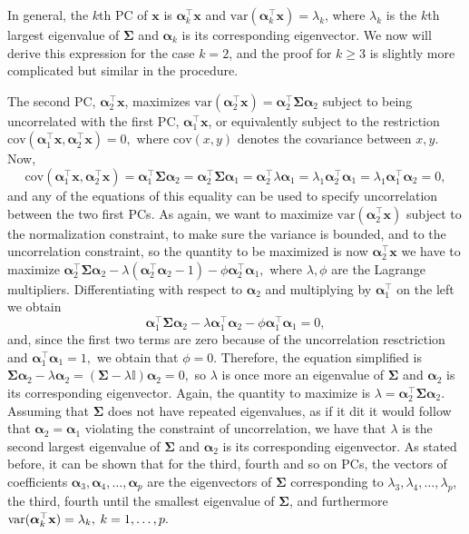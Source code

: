 \documentclass[11pt, oneside]{book}
\theoremstyle{plain}
\theoremstyle{remark}
\begin{document}
In general, the $k$th PC of $\mathbf{x}$ is $\bm{\alpha}_k^\top\mathbf{x}$ and
$\text{var}(\bm{\alpha}_k^\top\mathbf{x}) = \lambda_k$, where $\lambda_k$ is the
$k$th largest eigenvalue of $\mathbf{\Sigma}$ and $\bm{\alpha}_k$ is its
corresponding eigenvector. We now will derive this expression for the case
$k=2$, and the proof for $k\geq 3$  is slightly more complicated but similar in
the procedure. 

The second PC, $\bm{\alpha}_2^\top\mathbf{x}$, maximizes
$\text{var}(\bm{\alpha}_2^\top\mathbf{x}) =
\bm{\alpha}_2^\top\mathbf{\Sigma}\bm{\alpha}_2$ subject to being uncorrelated
with the first PC, $\bm{\alpha}_1^\top\mathbf{x}$, or equivalently subject to
the restriction $\text{cov}(\bm{\alpha}_1^\top\mathbf{x},
\bm{\alpha}_2^\top\mathbf{x}) = 0,$ where $\text{cov}(x,y)$ denotes the
covariance between $x,y$. Now,
$$\text{cov}(\bm{\alpha}_1^\top\mathbf{x},\bm{\alpha}_2^\top\mathbf{x}) =
\bm{\alpha}_1^\top\mathbf{\Sigma}\bm{\alpha}_2 =
\bm{\alpha}_2^\top\mathbf{\Sigma}\bm{\alpha}_1 =
\bm{\alpha}_2^\top\lambda\bm{\alpha}_1 =\lambda_1\bm{\alpha}_2^\top\bm{\alpha}_1
= \lambda_1\bm{\alpha}_1^\top\bm{\alpha}_2 = 0,$$ and any of the equations of
this equality can be used to specify uncorrelation between the two first PCs.
As again, we want to maximize $\text{var}(\bm{\alpha}_2^\top\mathbf{x})$ subject
to the normalization constraint, to make sure the variance is bounded, and to
the uncorrelation constraint, so the quantity to be maximized is now
$\bm{\alpha}_2^\top\mathbf{x}$ we have to maximize
$\bm{\alpha}_2^\top\mathbf{\Sigma}\bm{\alpha}_2 -
\lambda(\bm{\alpha}_2^\top\bm{\alpha}_2 - 1) -
\phi\bm{\alpha}_2^\top\bm{\alpha}_1,$ where $\lambda,\phi$ are the Lagrange
multipliers. Differentiating with respect to $\bm{\alpha}_2$ and multiplying by
$\bm{\alpha}_1^\top$ on the left we obtain
$$\bm{\alpha}_1^\top\mathbf{\Sigma}\bm{\alpha}_2 -
\lambda\bm{\alpha}_1^\top\bm{\alpha}_2 - \phi\bm{\alpha}_1^\top\bm{\alpha}_1 =
0,$$ and, since the first two terms are zero because of the uncorrelation
resctriction and $\bm{\alpha}_1^\top\bm{\alpha}_1 = 1,$ we obtain that $\phi=0$.
Therefore, the equation simplified is $\mathbf{\Sigma}\bm{\alpha}_2 -
\lambda\bm{\alpha}_2 = (\mathbf{\Sigma} - \lambda\mathbb{I})\bm{\alpha}_2 = 0,$
so $\lambda$ is once more an eigenvalue of $\bm{\Sigma}$ and $\bm{\alpha}_2$ is
its corresponding eigenvector. Again, the quantity to maximize is $\lambda =
\bm{\alpha}_2^\top\mathbf{\Sigma}\bm{\alpha}_2$. Assuming that $\mathbf{\Sigma}$
does not have repeated eigenvalues, as if it dit it would follow that
$\bm{\alpha}_2 = \bm{\alpha}_1$ violating the constraint of uncorrelation, we
have that $\lambda$ is the second largest eigenvalue of $\mathbf{\Sigma}$ and
$\bm{\alpha}_2$ is its corresponding eigenvector. As stated before, it can be
shown that for the third, fourth and so on PCs, the vectors of coefficients
$\bm{\alpha}_3, \bm{\alpha}_4,\dots, \bm{\alpha}_p$ are the eigenvectors of
$\mathbf{\Sigma}$ corresponding to $\lambda_3, \lambda_4,\dots,\lambda_p$, the
third, fourth until the smallest eigenvalue of $\mathbf{\Sigma}$, and
furthermore $\text{var}(\bm{\alpha}_k^\top\mathbf{x}) =
\lambda_k,\hspace{.25em}k=1,\dots,p.$ 
\end{document}
